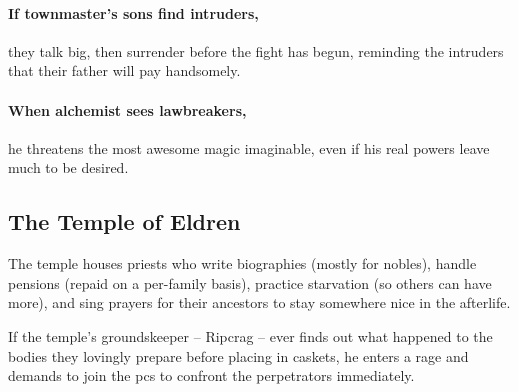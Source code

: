 
\paragraph{If \gls{townmaster}'s sons find intruders,}
they talk big, then surrender before the fight has begun, reminding the intruders that their father will pay handsomely.

\citadelAlchemist

\showStdSpells

\label{citadel_alchemist}

\paragraph{When \gls{alchemist} sees lawbreakers,}
he threatens the most awesome magic imaginable, even if his real powers leave much to be desired.

\townmaster

\subsection{The Temple of Eldren}

The temple houses priests who write biographies (mostly for nobles), handle pensions (repaid on a per-family basis), practice starvation (so others can have more), and sing prayers for their ancestors to stay somewhere nice in the afterlife.

If the temple's groundskeeper -- Ripcrag -- ever finds out what happened to the bodies they lovingly prepare before placing in caskets, he enters a rage and demands to join the \glspl{pc} to confront the perpetrators immediately.


